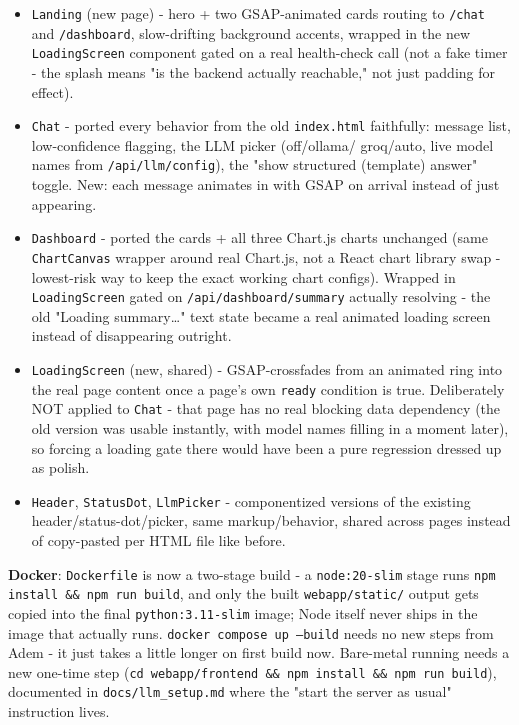 \begin{itemize}
\item \texttt{Landing} (new page) - hero + two GSAP-animated cards routing to \texttt{/\allowbreak{}chat} and \texttt{/\allowbreak{}dashboard}, slow-drifting background accents, wrapped in the new \texttt{LoadingScreen} component gated on a real health-check call (not a fake timer - the splash means "is the backend actually reachable," not just padding for effect).
\item \texttt{Chat} - ported every behavior from the old \texttt{index.html} faithfully: message list, low-confidence flagging, the LLM picker (off/ollama/ groq/auto, live model names from \texttt{/\allowbreak{}api/\allowbreak{}llm/\allowbreak{}config}), the "show structured (template) answer" toggle. New: each message animates in with GSAP on arrival instead of just appearing.
\item \texttt{Dashboard} - ported the cards + all three Chart.js charts unchanged (same \texttt{ChartCanvas} wrapper around real Chart.js, not a React chart library swap - lowest-risk way to keep the exact working chart configs). Wrapped in \texttt{LoadingScreen} gated on \texttt{/\allowbreak{}api/\allowbreak{}dashboard/\allowbreak{}summary} actually resolving - the old "Loading summary…" text state became a real animated loading screen instead of disappearing outright.
\item \texttt{LoadingScreen} (new, shared) - GSAP-crossfades from an animated ring into the real page content once a page's own \texttt{ready} condition is true. Deliberately NOT applied to \texttt{Chat} - that page has no real blocking data dependency (the old version was usable instantly, with model names filling in a moment later), so forcing a loading gate there would have been a pure regression dressed up as polish.
\item \texttt{Header}, \texttt{StatusDot}, \texttt{LlmPicker} - componentized versions of the existing header/status-dot/picker, same markup/behavior, shared across pages instead of copy-pasted per HTML file like before.
\end{itemize}
\textbf{Docker}: \texttt{Dockerfile} is now a two-stage build - a \texttt{node:20-slim} stage runs \texttt{npm install \&\& npm run build}, and only the built \texttt{webapp/\allowbreak{}static/\allowbreak{}} output gets copied into the final \texttt{python:3.11-slim} image; Node itself never ships in the image that actually runs. \texttt{docker compose up --build} needs no new steps from Adem - it just takes a little longer on first build now. Bare-metal running needs a new one-time step (\texttt{cd webapp/\allowbreak{}frontend \&\& npm install \&\& npm run build}), documented in \texttt{docs/\allowbreak{}llm\_\allowbreak{}setup.md} where the "start the server as usual" instruction lives.

